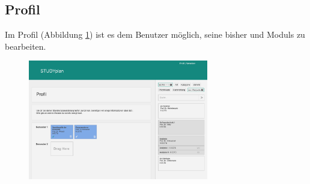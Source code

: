 \subsection{Profil}
Im Profil (Abbildung \ref{fig:gui-profil-1}) ist es dem Benutzer möglich, seine bisher  und  \glspl{Modul} zu bearbeiten.
\begin{figure}[!htb]
	\caption{}
	\label{fig:gui-profil-1}
	\centering
	\includegraphics[width=0.7\textwidth]{../GUI/ergebnisse/profil-1.png}
\end{figure}